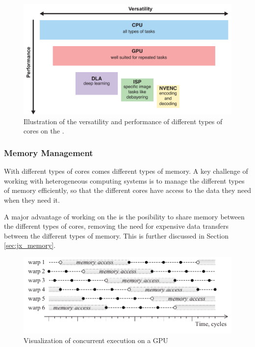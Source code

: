 \begin{figure}
    \centering
    \includegraphics[width=\textwidth]{figures/PDF/jx_hierarchy.pdf}
    \caption{Illustration of the versatility and performance of different types of cores on the \jx.}
    \label{fig:jx_hierarchy}
\end{figure}


\subsubsection{Memory Management}
With different types of cores comes different types of memory.
A key challenge of working with heterogeneous computing systems is to manage the different types of memory efficiently, so that the different cores have access to the data they need when they need it.

A major advantage of working on the \jx is the posibility to share memory between the different types of cores, removing the need for expensive data transfers between the different types of memory.
This is further discussed in Section \ref{sec:jx_memory}.

\begin{figure}
    \centering
    \includegraphics[width=\textwidth]{figures/PDF/concurrency_p54.pdf}
    \caption{Visualization of concurrent execution on a GPU \cite[54]{VolkovLatencyHiding2016}}
    \label{fig:concurrency}
\end{figure}


